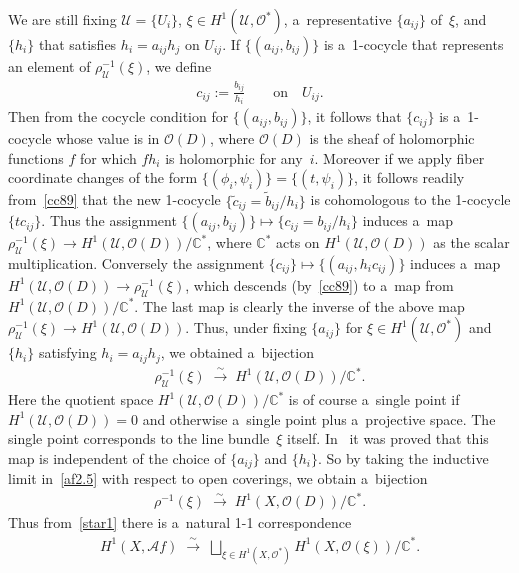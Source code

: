 \documentclass[pdftex]{sigma}
\numberwithin{equation}{section}
\begin{document}
We are still f\/ixing $\mathscr U=\{U_i\}$, $\xi \in H^1(\mathscr U,\mathscr O^*)$, a~representative $\{a_{ij}\}$ of~$\xi$,
and $\{h_i\}$ that satisf\/ies $h_i=a_{ij}h_j$ on $U_{ij}$.
If $\{(a_{ij},b_{ij})\}$ is a~1-cocycle that represents an element of $\rho^{-1}_{\mathscr U}(\xi)$, we def\/ine
\begin{gather*}
c_{ij}:= \frac{b_{ij}}{h_i}
\qquad
\text{on}
\quad
U_{ij}.
\end{gather*}
Then from the cocycle condition for $\{(a_{ij},b_{ij})\}$, it follows that $\{c_{ij}\}$ is a~1-cocycle whose value is in
$\mathscr O(D)$, where $\mathscr O(D)$ is the sheaf of holomorphic functions $f$ for which $fh_i$ is holomorphic for any~$i$.
Moreover if we apply f\/iber coordinate changes of the form $\{(\phi_i,\psi_i)\}=\{(t,\psi_i)\}$, it follows readily
from~\eqref{cc89} that the new 1-cocycle $\{\tilde c_{ij} = \tilde b_{ij}/h_i\}$ is cohomologous to the 1-cocycle
$\{tc_{ij}\}$.
Thus the assignment $\{(a_{ij},b_{ij})\} \mapsto \{c_{ij}=b_{ij}/h_i\}$ induces a~map $\rho_{\mathscr U}^{-1}(\xi)\to
H^1(\mathscr U,\mathscr O(D))/\mathbb{C}^*$, where $\mathbb{C}^*$ acts on $H^1(\mathscr U,\mathscr O(D))$ as the scalar
multiplication.
Conversely the assignment $\{c_{ij}\}\mapsto \{(a_{ij},h_ic_{ij})\}$ induces a~map $H^1(\mathscr U,\mathscr O(D))\to
\rho_{\mathscr U}^{-1}(\xi)$, which descends (by~\eqref{cc89}) to a~map from $H^1(\mathscr U,\mathscr
O(D))/\mathbb{C}^*$.
The last map is clearly the inverse of the above map $\rho_{\mathscr U}^{-1}(\xi)\to H^1(\mathscr U,\mathscr O(D))$.
Thus, under f\/ixing $\{a_{ij}\}$ for $\xi\in H^1(\mathscr U,\mathscr O^*)$ and $\{h_i\}$ satisfying $h_i = a_{ij}h_j$,
we obtained a~bijection
\begin{gather}
\label{af2.5}
\rho_{\mathscr U}^{-1}(\xi)
\; \stackrel{\sim}{\longrightarrow}
\;
H^1(\mathscr U,\mathscr O(D))/\mathbb{C}^*.
\end{gather}
Here the quotient space $H^1(\mathscr U,\mathscr O(D))/\mathbb{C}^*$ is of course a~single point if $H^1(\mathscr
U,\mathscr O(D))=0$ and otherwise a~single point plus a~projective space.
The single point corresponds to the line bundle~$\xi$ itself.
In~\cite{At55} it was proved that this map is independent of the choice of $\{a_{ij}\}$ and $\{h_i\}$.
So by taking the inductive limit in~\eqref{af2.5} with respect to open coverings, we obtain a~bijection
\begin{gather*}%
\rho^{-1}(\xi)
\;\stackrel{\sim}{\longrightarrow}
\;
H^1(X,\mathscr O(D))/\mathbb{C}^*.
\end{gather*}
Thus from~\eqref{star1} there is a~natural 1-1 correspondence
\begin{gather}
\label{af3}
H^1(X,\mathscr Af)
\;\stackrel{\sim}{\longrightarrow}
\;
\bigsqcup_{\xi\in H^1(X,\mathscr O^*)} H^1(X, \mathscr O(\xi)) /\mathbb{C}^*.
\end{gather}
\end{document}
